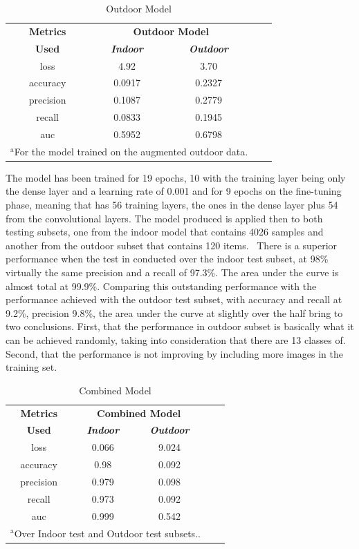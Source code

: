 \documentclass[conference]{IEEEtran}
\begin{document}
\begin{table}[htbp]
\caption{Outdoor Model}
\begin{center}
\begin{tabular}{|c|c|c|c|c|}
\hline
\textbf{Metrics}&\multicolumn{2}{|c|}{\textbf{Outdoor Model}} \\
\cline{2-3} 
\textbf{Used} & \textbf{\textit{Indoor}}& \textbf{\textit{Outdoor}} \\
\hline
loss  &4.92 &3.70  \\
\hline
accuracy  &0.0917 &0.2327 \\
\hline
precision  &0.1087 &0.2779 \\
\hline
recall  &0.0833 &0.1945 \\
\hline
auc  &0.5952 &0.6798  \\
\hline
\multicolumn{3}{l}{$^{\mathrm{a}}$For the model trained on the augmented outdoor data.}
\end{tabular}
\label{tab1}
\end{center}
\end{table}

The model has been trained for 19 epochs, 10 with the training layer being only the dense layer and a learning rate of 0.001 and for 9 epochs on the fine-tuning phase, meaning that has 56 training layers, the ones in the dense layer plus 54 from the convolutional layers. The model produced is applied then to both testing subsets, one from the indoor model that contains 4026 samples and another from the outdoor subset that contains 120 items. \
There is a superior performance when the test in conducted over the indoor test subset, at 98\% virtually the same precision and a recall of 97.3\%. The area under the curve is almost total at 99.9\%. Comparing this outstanding performance with the performance achieved with the outdoor test subset, with accuracy and recall at 9.2\%, precision 9.8\%, the area under the curve at slightly over the half bring to two conclusions. First, that the performance in outdoor subset is basically what it can be achieved randomly, taking into consideration that there are 13 classes of. Second, that the performance is not improving by including more images in the training set. \

\begin{table}[htbp]
\caption{Combined Model}
\begin{center}
\begin{tabular}{|c|c|c|c|c|}
\hline
\textbf{Metrics}&\multicolumn{2}{|c|}{\textbf{Combined Model}} \\
\cline{2-3} 
\textbf{Used} & \textbf{\textit{Indoor}}& \textbf{\textit{Outdoor}} \\
\hline
loss   &0.066 &9.024   \\
\hline
accuracy   &0.98 &0.092  \\
\hline
precision   &0.979 &0.098 \\
\hline
recall   &0.973 &0.092 \\
\hline
auc   &0.999 &0.542   \\
\hline
\multicolumn{3}{l}{$^{\mathrm{a}}$Over Indoor test and Outdoor test subsets..}
\end{tabular}
\label{tab1}
\end{center}
\end{table}
\end{document}
